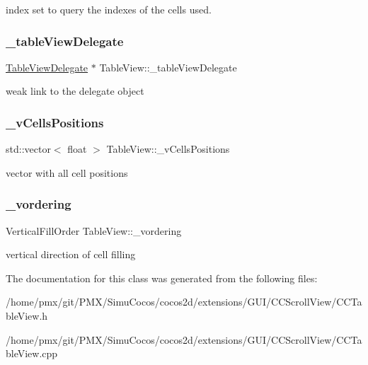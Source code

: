 index set to query the indexes of the cells used. \mbox{\label{classTableView_a8ce7267b530c5e8d23cf60518527eeca}} 
\subsubsection{\texorpdfstring{\+\_\+table\+View\+Delegate}{\_tableViewDelegate}}
{\footnotesize\ttfamily \hyperlink{classTableViewDelegate}{Table\+View\+Delegate} $\ast$ Table\+View\+::\+\_\+table\+View\+Delegate\hspace{0.3cm}{\ttfamily [protected]}}

weak link to the delegate object \mbox{\label{classTableView_a1f5376c490fbbfe40edf5e016c364567}} 
\subsubsection{\texorpdfstring{\+\_\+v\+Cells\+Positions}{\_vCellsPositions}}
{\footnotesize\ttfamily std\+::vector$<$ float $>$ Table\+View\+::\+\_\+v\+Cells\+Positions\hspace{0.3cm}{\ttfamily [protected]}}

vector with all cell positions \mbox{\label{classTableView_a6cbf92892d660a0783a25e301c8f9358}} 
\subsubsection{\texorpdfstring{\+\_\+vordering}{\_vordering}}
{\footnotesize\ttfamily Vertical\+Fill\+Order Table\+View\+::\+\_\+vordering\hspace{0.3cm}{\ttfamily [protected]}}

vertical direction of cell filling 

The documentation for this class was generated from the following files\+:\begin{DoxyCompactItemize}
\item 
/home/pmx/git/\+P\+M\+X/\+Simu\+Cocos/cocos2d/extensions/\+G\+U\+I/\+C\+C\+Scroll\+View/C\+C\+Table\+View.\+h\item 
/home/pmx/git/\+P\+M\+X/\+Simu\+Cocos/cocos2d/extensions/\+G\+U\+I/\+C\+C\+Scroll\+View/C\+C\+Table\+View.\+cpp\end{DoxyCompactItemize}
